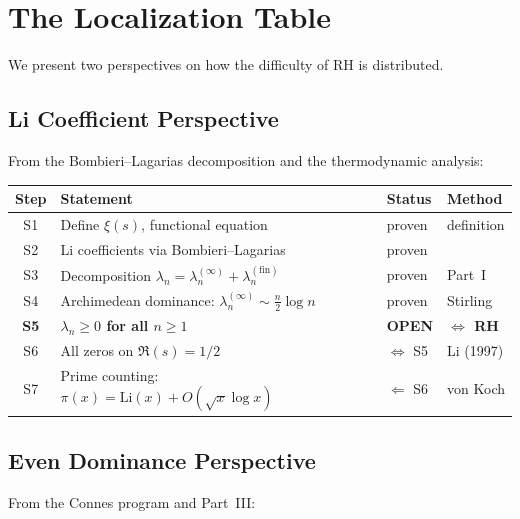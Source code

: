 \documentclass[12pt,a4paper]{article}
\theoremstyle{definition}
\theoremstyle{remark}
\begin{document}
\section{The Localization Table}
\label{sec:localization}

We present two perspectives on how the difficulty of RH is distributed.

\subsection{Li Coefficient Perspective}

From the Bombieri--Lagarias decomposition and the thermodynamic analysis:

\begin{center}
\renewcommand{\arraystretch}{1.2}
\begin{tabular}{c|l|l|l}
\textbf{Step} & \textbf{Statement} & \textbf{Status} & \textbf{Method} \\\hline
S1 & Define $\xi(s)$, functional equation & proven & definition \\
S2 & Li coefficients via Bombieri--Lagarias & proven & \cite{BombieriLagarias1999} \\
S3 & Decomposition $\lambda_n = \lambda_n^{(\infty)} + \lambda_n^{(\mathrm{fin})}$ & proven & Part~I \\
S4 & Archimedean dominance: $\lambda_n^{(\infty)} \sim \frac{n}{2}\log n$ & proven & Stirling \\
\textbf{S5} & \textbf{$\lambda_n \geq 0$ for all $n \geq 1$} & \textbf{OPEN} & \textbf{$\Longleftrightarrow$ RH} \\
S6 & All zeros on $\Re(s) = 1/2$ & $\Leftrightarrow$ S5 & Li (1997) \\
S7 & Prime counting: $\pi(x) = \mathrm{Li}(x) + O(\sqrt{x}\log x)$ & $\Leftarrow$ S6 & von Koch
\end{tabular}
\end{center}

\subsection{Even Dominance Perspective}

From the Connes program and Part~III:
\end{document}
